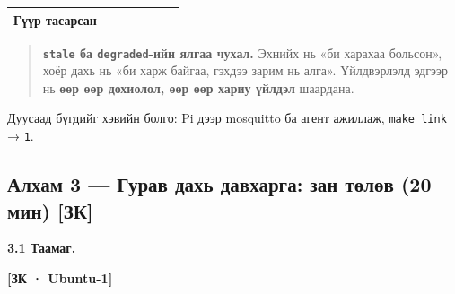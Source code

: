 \begin{longtable}[]{@{}lllllll@{}}
\begin{minipage}[t]{0.12\columnwidth}\raggedright
Гүүр тасарсан\strut
\end{minipage} & \begin{minipage}[t]{0.12\columnwidth}\raggedright
\strut
\end{minipage} & \begin{minipage}[t]{0.12\columnwidth}\raggedright
\strut
\end{minipage} & \begin{minipage}[t]{0.12\columnwidth}\raggedright
\strut
\end{minipage} & \begin{minipage}[t]{0.12\columnwidth}\raggedright
\strut
\end{minipage} & \begin{minipage}[t]{0.12\columnwidth}\raggedright
\strut
\end{minipage} & \begin{minipage}[t]{0.12\columnwidth}\raggedright
\strut
\end{minipage}\tabularnewline
\bottomrule
\end{longtable}\endgroup

\begin{quote}
\textbf{\texttt{stale} ба \texttt{degraded}-ийн ялгаа чухал.} Эхнийх нь «би харахаа больсон», хоёр дахь нь «би харж байгаа, гэхдээ зарим нь алга». Үйлдвэрлэлд эдгээр нь \textbf{өөр өөр дохиолол, өөр өөр хариу үйлдэл} шаардана.
\end{quote}

Дуусаад бүгдийг хэвийн болго: Pi дээр mosquitto ба агент ажиллаж, \texttt{make\ link} → \texttt{1}.

\hypertarget{ux430ux43bux445ux430ux43c-3-ux433ux443ux440ux430ux432-ux434ux430ux445ux44c-ux434ux430ux432ux445ux430ux440ux433ux430-ux437ux430ux43d-ux442ux4e9ux43bux4e9ux432-20-ux43cux438ux43d-ux437ux43a}{%
\subsection{Алхам 3 --- Гурав дахь давхарга: зан төлөв (20 мин) {[}ЗК{]}}\label{ux430ux43bux445ux430ux43c-3-ux433ux443ux440ux430ux432-ux434ux430ux445ux44c-ux434ux430ux432ux445ux430ux440ux433ux430-ux437ux430ux43d-ux442ux4e9ux43bux4e9ux432-20-ux43cux438ux43d-ux437ux43a}}

\textbf{3.1 Таамаг.}

\textbf{{[}ЗК · Ubuntu-1{]}}

\begin{Shaded}
\begin{Highlighting}[]
\KeywordTok{|} 
\end{Highlighting}
\end{Shaded}

